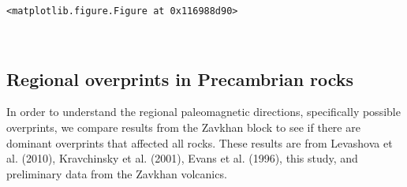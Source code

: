 \documentclass[11pt]{article}
\begin{document}
    
    \begin{verbatim}
<matplotlib.figure.Figure at 0x116988d90>
    \end{verbatim}

    
    \begin{center}
    \end{center}
    { \hspace*{\fill} \\}
    
    \subsection{Regional overprints in Precambrian
rocks}\label{regional-overprints-in-precambrian-rocks}

    In order to understand the regional paleomagnetic directions,
specifically possible overprints, we compare results from the Zavkhan
block to see if there are dominant overprints that affected all rocks.
These results are from Levashova et al. (2010), Kravchinsky et al.
(2001), Evans et al. (1996), this study, and preliminary data from the
Zavkhan volcanics.
\end{document}

